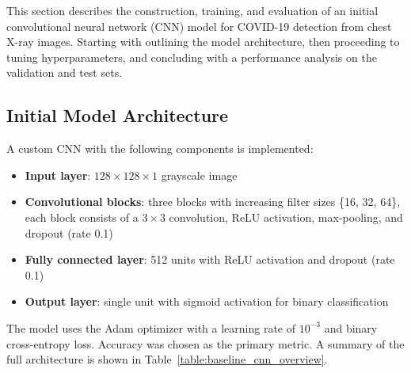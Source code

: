 \documentclass[conference]{IEEEtran}
\begin{document}
This section describes the construction, training, and evaluation of an initial convolutional neural network (CNN) model for COVID-19 detection from chest X-ray images. Starting with outlining the model architecture, then proceeding to tuning hyperparameters, and concluding with a performance analysis on the validation and test sets.

\subsection{Initial Model Architecture}
A custom CNN with the following components is implemented:
\begin{itemize}
	\item \textbf{Input layer}: $128\times128\times1$ grayscale image
	\item \textbf{Convolutional blocks}: three blocks with increasing filter sizes \{16, 32, 64\}, each block consists of a $3\times3$ convolution, ReLU activation, max-pooling, and dropout (rate 0.1)
	\item \textbf{Fully connected layer}: 512 units with ReLU activation and dropout (rate 0.1)
	\item \textbf{Output layer}: single unit with sigmoid activation for binary classification
\end{itemize}

The model uses the Adam optimizer with a learning rate of $10^{-3}$ and binary cross-entropy loss. Accuracy was chosen as the primary metric. A summary of the full architecture is shown in Table~\ref{table:baseline_cnn_overview}.
\end{document}
